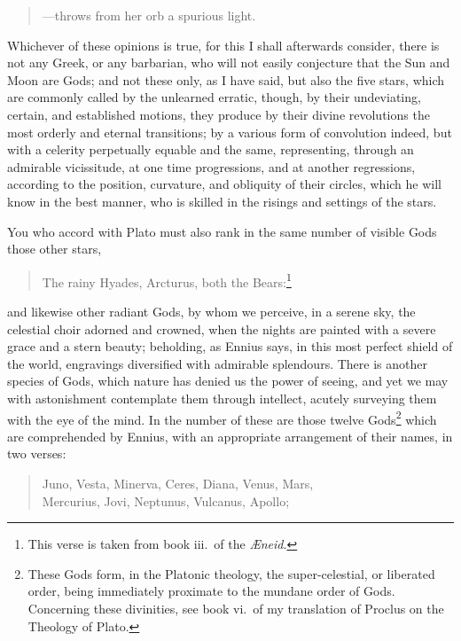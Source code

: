 \documentclass{article}
\begin{document}
\begin{verse}
---throws from her orb a spurious light. 
\end{verse}

\noindent Whichever of these opinions is true, for this I shall afterwards
consider, there is not any Greek, or any barbarian, who will not easily
conjecture that the Sun and Moon are Gods; and not these only, as I have said,
but also the five stars, which are commonly called by the unlearned erratic,
though, by their undeviating, certain, and established motions, they produce by
their divine revolutions the most orderly and eternal transitions; by a various
form of convolution indeed, but with a celerity perpetually equable and the
same, representing, through an admirable vicissitude, at one time progressions,
and at another regressions, according to the position, curvature, and obliquity
of their circles, which he will know in the best manner, who is skilled in the
risings and settings of the stars.

You who accord with Plato must also rank in the same number of visible Gods
those other stars,

\begin{verse}
The rainy Hyades, Arcturus, both the Bears:\footnote{This verse is taken from
book iii.~of the \textit{{\AE}neid}.}
\end{verse}

\noindent and likewise other radiant Gods, by whom we perceive, in a serene
sky, the celestial choir adorned and crowned, when the nights are painted with
a severe grace and a stern beauty; beholding, as Ennius says, in this most
perfect shield of the world, engravings diversified with admirable splendours.
There is another species of Gods, which nature has denied us the power of
seeing, and yet we may with astonishment contemplate them through intellect,
acutely surveying them with the eye of the mind. In the number of these are
those twelve Gods\footnote{These Gods form, in the Platonic theology, the
super-celestial, or liberated order, being immediately proximate to the mundane
order of Gods. Concerning these divinities, see book vi.~of my translation of
Proclus on the Theology of Plato.} which are comprehended by Ennius,
with an appropriate arrangement of their names, in two verses:

\begin{verse}
Juno, Vesta, Minerva, Ceres, Diana, Venus, Mars,\\
Mercurius, Jovi, Neptunus, Vulcanus, Apollo;
\end{verse}
\end{document}
